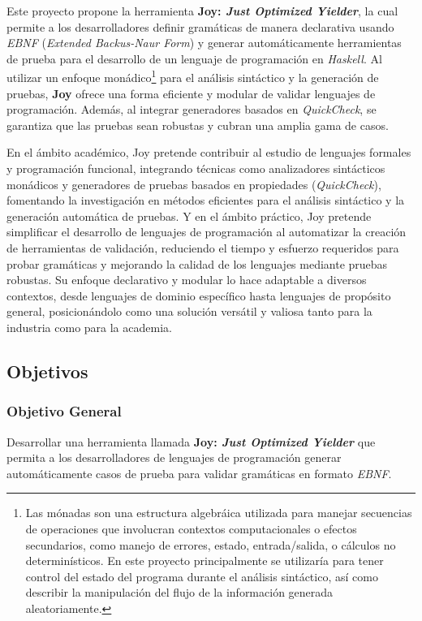\documentclass[11pt]{article}
\begin{document}
Este proyecto propone la herramienta \textbf{Joy: \textit{Just Optimized Yielder}}, la cual permite a los desarrolladores definir gramáticas de manera declarativa usando \textit{EBNF} (\textit{Extended Backus-Naur Form}) y generar automáticamente herramientas de prueba para el desarrollo de un lenguaje de programación en \textit{Haskell}. Al utilizar un enfoque monádico\footnote[1]{Las mónadas son una estructura algebráica utilizada para manejar secuencias de operaciones que involucran contextos computacionales o efectos secundarios, como manejo de errores, estado, entrada/salida, o cálculos no determinísticos. En este proyecto principalmente se utilizaría para tener control del estado del programa durante el análisis sintáctico, así como describir la manipulación del flujo de la información generada aleatoriamente.} para el análisis sintáctico y la generación de pruebas, \textbf{Joy} ofrece una forma eficiente y modular de validar lenguajes de programación. Además, al integrar generadores basados en \textit{QuickCheck}\cite{quickcheck_manual}, se garantiza que las pruebas sean robustas y cubran una amplia gama de casos.

En el ámbito académico, Joy pretende contribuir al estudio de lenguajes formales y programación funcional, integrando técnicas como analizadores sintácticos monádicos y generadores de pruebas basados en propiedades (\textit{QuickCheck}), fomentando la investigación en métodos eficientes para el análisis sintáctico y la generación automática de pruebas. Y en el ámbito práctico, Joy pretende simplificar el desarrollo de lenguajes de programación al automatizar la creación de herramientas de validación, reduciendo el tiempo y esfuerzo requeridos para probar gramáticas y mejorando la calidad de los lenguajes mediante pruebas robustas. Su enfoque declarativo y modular lo hace adaptable a diversos contextos, desde lenguajes de dominio específico hasta lenguajes de propósito general, posicionándolo como una solución versátil y valiosa tanto para la industria como para la academia.

\subsection*{Objetivos}

\subsubsection*{Objetivo General}

Desarrollar una herramienta llamada \textbf{Joy: \textit{Just Optimized Yielder}} que permita a los desarrolladores de lenguajes de programación generar automáticamente casos de prueba para validar gramáticas en formato \textit{EBNF}.
\end{document}
